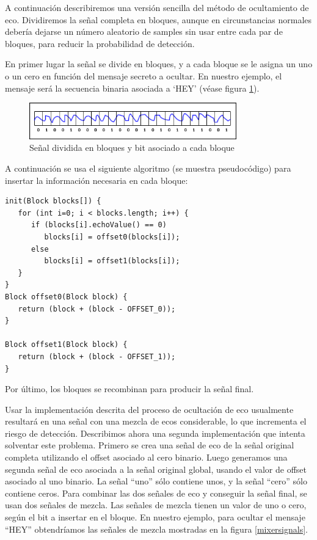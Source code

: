 \documentclass[12pt]{article}
\begin{document}
A continuación describiremos una versión sencilla del método de ocultamiento de eco. Dividiremos la señal completa en bloques, aunque en circunstancias normales debería dejarse un número aleatorio de samples sin usar entre cada par de bloques, para reducir la probabilidad de detección.

En primer lugar la señal se divide en bloques, y a cada bloque se le asigna un uno o un cero en función del mensaje secreto a ocultar. En nuestro ejemplo, el mensaje será la secuencia binaria asociada a `HEY' (véase figura \ref{echodividesignal}).

\begin{figure}
  \centering
    \includegraphics[width=0.8\textwidth]{img/echodividesignal}
  \caption{Señal dividida en bloques y bit asociado a cada bloque}
  \label{echodividesignal}
\end{figure}

A continuación se usa el siguiente algoritmo (se muestra pseudocódigo) para insertar la información necesaria en cada bloque:

\begin{lstlisting}[style=mycode]
init(Block blocks[]) { 
   for (int i=0; i < blocks.length; i++) { 
      if (blocks[i].echoValue() == 0) 
         blocks[i] = offset0(blocks[i]); 
      else 
         blocks[i] = offset1(blocks[i]); 
   } 
}
Block offset0(Block block) { 
   return (block + (block - OFFSET_0)); 
}

Block offset1(Block block) { 
   return (block + (block - OFFSET_1)); 
}
\end{lstlisting}

Por último, los bloques se recombinan para producir la señal final.

Usar la implementación descrita del proceso de ocultación de eco usualmente resultará en una señal con una mezcla de ecos considerable, lo que incrementa el riesgo de detección. Describimos ahora una segunda implementación que intenta solventar este problema. Primero se crea una señal de eco de la señal original completa utilizando el offset asociado al cero binario. Luego generamos una segunda señal de eco asociada a la señal original global, usando el valor de offset asociado al uno binario. La señal ``uno'' sólo contiene unos, y la señal ``cero'' sólo contiene ceros. Para combinar las dos señales de eco y conseguir la señal final, se usan dos señales de mezcla. Las señales de mezcla tienen un valor de uno o cero, según el bit a insertar en el bloque. En nuestro ejemplo, para ocultar el mensaje ``HEY'' obtendríamos las señales de mezcla mostradas en la figura \ref{mixersignals}.
\end{document}
